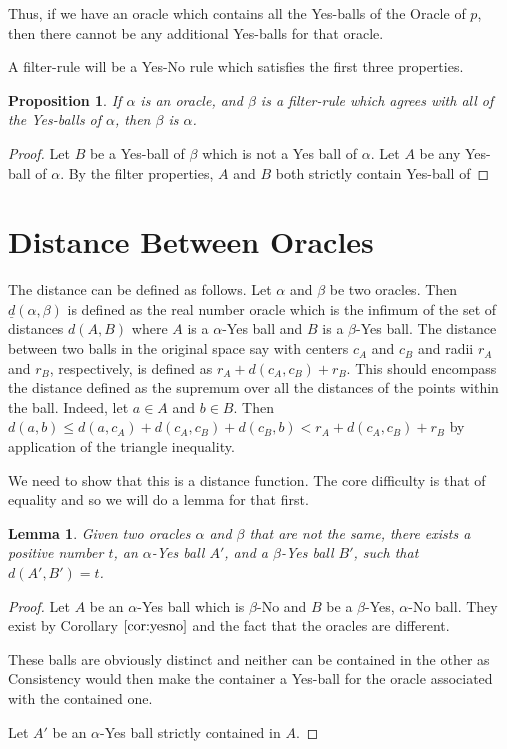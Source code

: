 \documentclass[12pt]{article}
\newtheorem{lemma}{Lemma}[section]
\newtheorem{proposition}{Proposition}[section]
\begin{document}
Thus, if we have an oracle which contains all the Yes-balls of the Oracle of $p$, then there cannot be any additional Yes-balls for that oracle. 

A filter-rule will be a Yes-No rule which satisfies the first three properties. 

\begin{proposition}
    If $\alpha$ is an oracle, and $\beta$ is a filter-rule which agrees with all of the Yes-balls of $\alpha$, then $\beta$ is $\alpha$.
\end{proposition}

\begin{proof}
    Let $B$ be a Yes-ball of $\beta$ which is not a Yes ball of $\alpha$. Let $A$ be any Yes-ball of $\alpha$. By the filter properties, $A$ and $B$ both strictly contain  Yes-ball of 
\end{proof}


\section{Distance Between Oracles}

The distance can be defined as follows. Let $\alpha$ and $\beta$ be two oracles. Then $\underline{d}(\alpha,\beta)$ is defined as the real number oracle which is the infimum of the set of distances $d(A, B)$ where $A$ is a $\alpha$-Yes ball and $B$ is a $\beta$-Yes ball. The distance between two balls in the original space say with centers $c_A$ and $c_B$ and radii $r_A$ and $r_B$, respectively, is defined as $r_A + d(c_A,c_B) + r_B$. This should encompass the distance defined as the supremum over all the distances of the points within the ball. Indeed, let $a \in A$ and $b\in B$. Then $d(a, b) \leq d(a,c_A) + d(c_A,c_B) + d(c_B,b) < r_A + d(c_A,c_B) + r_B$ by application of the triangle inequality. 

We need to show that this is a distance function. The core difficulty is that of equality and so we will do a lemma for that first. 

\begin{lemma}
    Given two oracles $\alpha$ and $\beta$ that are not the same, there exists a positive number $t$, an $\alpha$-Yes ball $A'$, and a $\beta$-Yes ball $B'$, such that $d(A', B') = t$.
\end{lemma}

\begin{proof}
     Let $A$ be an $\alpha$-Yes ball which is $\beta$-No and $B$ be a $\beta$-Yes, $\alpha$-No ball. They exist by Corollary $\ref{cor:yesno}$ and the fact that the oracles are different. 

     These balls are obviously distinct and neither can be contained in the other as Consistency would then make the container a Yes-ball for the oracle associated with the contained one. 

     Let $A'$ be an $\alpha$-Yes ball strictly contained in $A$. 

     
\end{proof}
\end{document}
